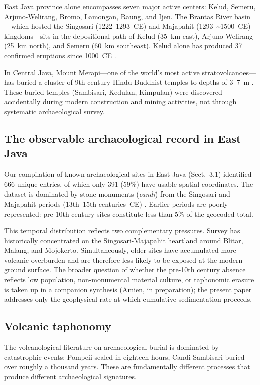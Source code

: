 \documentclass[12pt,a4paper]{article}
\begin{document}
East Java province alone encompasses seven major active centers: Kelud, Semeru, Arjuno-Welirang, Bromo, Lamongan, Raung, and Ijen. The Brantas River basin---which hosted the Singosari (1222--1293~CE) and Majapahit (1293--\textasciitilde1500~CE) kingdoms---sits in the depositional path of Kelud (35~km east), Arjuno-Welirang (25~km north), and Semeru (60~km southeast). Kelud alone has produced 37 confirmed eruptions since 1000~CE \citep{gvp2024,maeno2019}.

In Central Java, Mount Merapi---one of the world's most active stratovolcanoes---has buried a cluster of 9th-century Hindu-Buddhist temples to depths of 3--7~m \citep{lavigne2000,thouret2000}. These buried temples (Sambisari, Kedulan, Kimpulan) were discovered accidentally during modern construction and mining activities, not through systematic archaeological survey.

\subsection{The observable archaeological record in East Java}

Our compilation of known archaeological sites in East Java (Sect.~3.1) identified 666 unique entries, of which only 391 (59\%) have usable spatial coordinates. The dataset is dominated by stone monuments (\textit{candi}) from the Singosari and Majapahit periods (13th--15th centuries~CE) \citep{kinney2003}. Earlier periods are poorly represented: pre-10th century sites constitute less than 5\% of the geocoded total.

This temporal distribution reflects two complementary pressures. Survey has historically concentrated on the Singosari-Majapahit heartland around Blitar, Malang, and Mojokerto. Simultaneously, older sites have accumulated more volcanic overburden and are therefore less likely to be exposed at the modern ground surface. The broader question of whether the pre-10th century absence reflects low population, non-monumental material culture, or taphonomic erasure is taken up in a companion synthesis (Amien, in preparation); the present paper addresses only the geophysical rate at which cumulative sedimentation proceeds.

\subsection{Volcanic taphonomy}

The volcanological literature on archaeological burial is dominated by catastrophic events: Pompeii sealed in eighteen hours, Candi Sambisari buried over roughly a thousand years. These are fundamentally different processes that produce different archaeological signatures.
\end{document}
